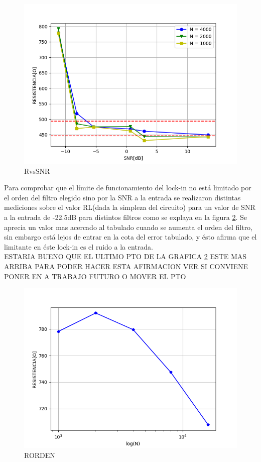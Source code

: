 \documentclass[11pt,a4paper]{extarticle}
\begin{document}
\begin{multicols}{2}
\begin{figure}[H]
	\centering
	\includegraphics[width=\linewidth]{Images/RvsSNR(segunda).png}
	\caption{RvsSNR}
	\label{fig:RvsSNR}
\end{figure}

Para comprobar que el límite de funcionamiento 
del lock-in no está limitado por el orden del 
filtro elegido sino por la SNR a la entrada
se realizaron distintas mediciones 
sobre el valor RL(dada la simpleza del circuito) 
para un valor de SNR a la entrada de -22.5dB para 
distintos filtros como se explaya en la figura 
\ref{fig:RORDEN}. Se aprecia un valor mas acercado 
al tabulado cuando se aumenta el orden del filtro, sin 
embargo está lejos de entrar en la cota del error 
tabulado, y ésto afirma que el limitante en éste 
lock-in es el ruido a la entrada.\\

ESTARIA BUENO QUE EL ULTIMO PTO DE LA GRAFICA \ref{fig:RORDEN}
ESTE MAS ARRIBA PARA PODER HACER ESTA AFIRMACION 
VER SI CONVIENE PONER EN A TRABAJO FUTURO O MOVER EL PTO\\

\begin{figure}[H]
	\centering
	\includegraphics[width=\linewidth]{Images/RORDEN.png}
	\caption{RORDEN}
	\label{fig:RORDEN}
\end{figure}


\end{multicols}
\end{document}
